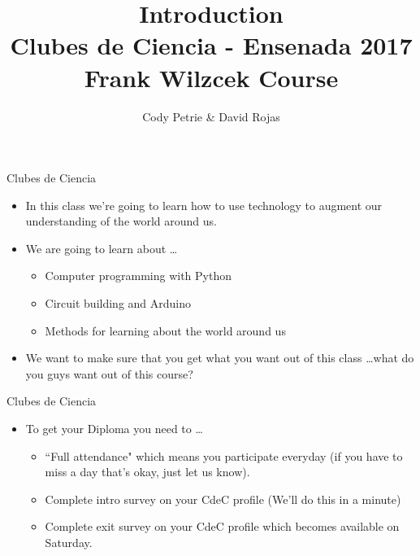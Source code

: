 \documentclass{beamer}
\title[{\color{white}{Intro}}]{{\Huge Introduction} \\ {\normalsize Clubes de Ciencia - Ensenada 2017 \\ Frank Wilzcek Course}}
\author{Cody Petrie \& David Rojas}
\institute{Universidad Aut\'onoma de Baja California}
\date{}
\begin{document}
\begin{frame}
   \titlepage
\end{frame}



\begin{frame}{Clubes de Ciencia}
   \begin{itemize}
      \item In this class we're going to learn how to use technology to augment our understanding of the world around us.
      \item We are going to learn about \ldots
      \begin{itemize}
         \item Computer programming with Python
         \item Circuit building and Arduino
         \item Methods for learning about the world around us
      \end{itemize}
      \item We want to make sure that you get what you want out of this class \ldots what do you guys want out of this course?
   \end{itemize}
\end{frame}

\begin{frame}{Clubes de Ciencia}
   \begin{itemize}
      \item To get your Diploma you need to \ldots
      \begin{itemize}
         \item ``Full attendance" which means you participate everyday (if you have to miss a day that's okay, just let us know).
         \item Complete intro survey on your CdeC profile (We'll do this in a minute)
         \item Complete exit survey on your CdeC profile which becomes available on Saturday.
      \end{itemize}
   \end{itemize}
\end{frame}
\end{document}
